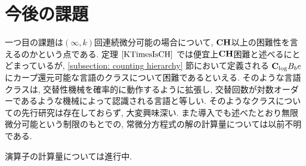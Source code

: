 \section{今後の課題}
一つ目の課題は$(\infty, k)$回連続微分可能の場合について,
$\mathbf{CH}$以上の困難性を言えるのかという点である.
定理 $\ref{KTimesIsCH}$ では便宜上$\mathbf{CH}$困難と述べるにとどまっているが,
\ref{subsection: counting hierarchy} 節において定義される
$\mathbf{C}_{\log} B_be$にカープ還元可能な言語のクラスについて困難であるといえる.
そのような言語クラスは, 交替性機械を確率的に動作するように拡張し,
交替回数が対数オーダーであるような機械によって認識される言語と等しい.
そのようなクラスについての先行研究は存在しておらず, 大変興味深い.
また導入でも述べたとおり無限微分可能という制限のもとでの,
常微分方程式の解の計算量については以前不明である.

演算子の計算量については進行中.
